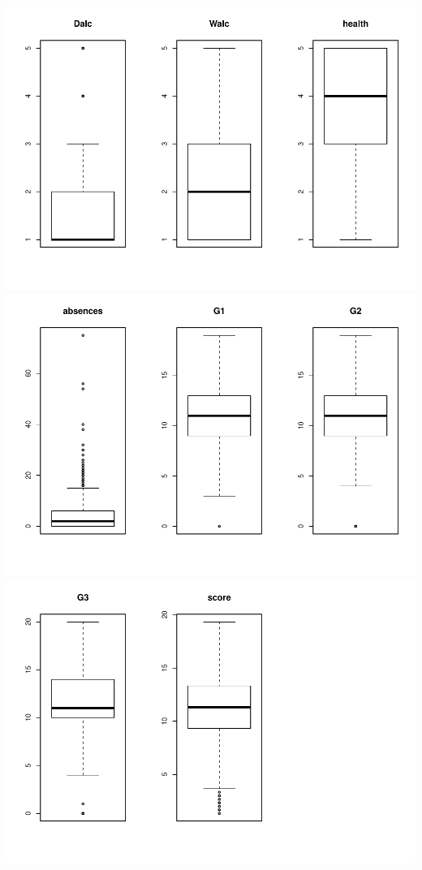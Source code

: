 \documentclass[]{article}
\begin{document}
\includegraphics{Practica2_files/figure-latex/unnamed-chunk-13-4.pdf}
\includegraphics{Practica2_files/figure-latex/unnamed-chunk-13-5.pdf}
\includegraphics{Practica2_files/figure-latex/unnamed-chunk-13-6.pdf}
\end{document}
